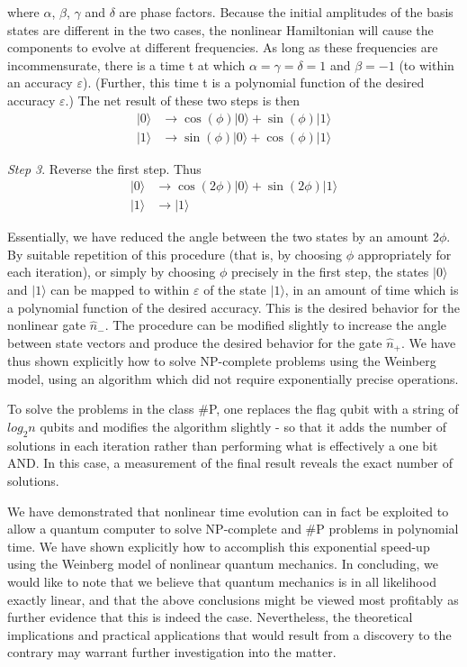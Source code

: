 \documentclass[12pt]{article}
\begin{document}
where $\alpha$, $\beta$, $\gamma$ and $\delta$ are phase factors. Because the
initial amplitudes of the basis states are different in the two cases, the
nonlinear Hamiltonian will cause the components to evolve at different
frequencies. As long as these frequencies are incommensurate, there is a time
t at which $\alpha=\gamma=\delta=1$ and $\beta=-1$ (to within an accuracy
$\varepsilon$). (Further, this time t is a polynomial function of the desired
accuracy $\varepsilon$.) The net result of these two steps is then
\begin{align}
|0\rangle &  \longrightarrow\cos(\phi)|0\rangle+\sin(\phi)|1\rangle\\
|1\rangle &  \longrightarrow\sin(\phi)|0\rangle+\cos(\phi)|1\rangle
\end{align}

\medskip\noindent
{\it Step 3}. Reverse the first step. Thus
\begin{align}
|0\rangle &  \longrightarrow\cos(2\phi)|0\rangle+\sin(2\phi)|1\rangle\\
|1\rangle &  \longrightarrow|1\rangle
\end{align}

Essentially, we have reduced the angle between the two states by an amount
2$\phi.$ By suitable repetition of this procedure (that is, by choosing $\phi$
appropriately for each iteration), or simply by choosing $\phi$ precisely in
the first step, the states $\vert 0 \rangle$ and $\vert 1 \rangle$
can be mapped to within $\varepsilon$ of the state $\vert 1 \rangle$, 
in an amount of time which is a polynomial function of the desired accuracy.
This is the desired behavior for the nonlinear gate $\widehat{n}_{-}$. The
procedure can be modified slightly to increase the angle between state vectors
and produce the desired behavior for the gate $\widehat{n}_{+}$. We have thus
shown explicitly how to solve NP-complete problems using the Weinberg model,
using an algorithm which did not require exponentially precise operations.

To solve the problems in the class \#P, one replaces the flag qubit with a
string of $log_{2}n$ qubits and modifies the algorithm slightly - so that it
adds the number of solutions in each iteration rather than performing what is
effectively a one bit AND. In this case, a measurement of the final result
reveals the exact number of solutions.

We have demonstrated that nonlinear time evolution can in fact be exploited to
allow a quantum computer to solve NP-complete and \#P problems in polynomial
time. We have shown explicitly how to accomplish this exponential speed-up
using the Weinberg model of nonlinear quantum mechanics. In concluding, we
would like to note that we believe that quantum mechanics is in all likelihood
exactly linear, and that the above conclusions might be viewed most profitably
as further evidence that this is indeed the case. Nevertheless, the
theoretical implications and practical applications that would result from a
discovery to the contrary may warrant further investigation into the matter.
\end{document}
